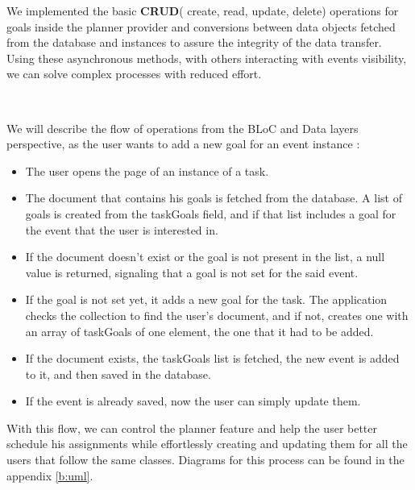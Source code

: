 We implemented the basic \textbf{CRUD}( create, read, update, delete) operations for goals inside the planner provider and conversions between data objects fetched from the database and instances to assure the integrity of the data transfer. Using these asynchronous methods, with others interacting with events visibility, we can solve complex processes with reduced effort.

~

We will describe the flow of operations from the BLoC and Data layers perspective, as the user wants to add a new goal for an event instance :  
\begin{itemize}
            \setlength{\topsep}{0.5pt}
            \setlength{\itemsep}{0.5pt}
            \setlength{\parsep}{0.5pt}
            \item The user opens the page of an instance of a task.
            \item The document that contains his goals is fetched from the database. A list of goals is created from the taskGoals field, and if that list includes a goal for the event that the user is interested in. 
            \item If the document doesn’t exist or the goal is not present in the list, a null value is returned, signaling that a goal is not set for the said event. 
            \item If the goal is not set yet, it adds a new goal for the task. The application checks the collection to find the user's document, and if not, creates one with an array of taskGoals of one element, the one that it had to be added. 
            \item If the document exists, the taskGoals list is fetched, the new event is added to it, and then saved in the database.
            \item If the event is already saved, now the user can simply update them.
\end{itemize}

With this flow, we can control the planner feature and help the user better schedule his assignments while effortlessly creating and updating them for all the users that follow the same classes. Diagrams for this process can be found in the appendix \ref{b:uml}.



